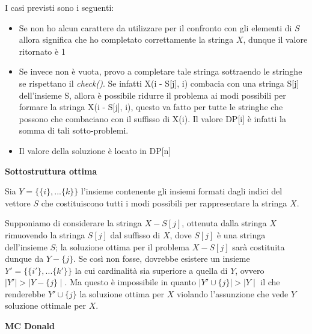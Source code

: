 \documentclass[../cheatSheetAlgoritmi.tex]{subfiles}
\begin{document}
I casi previsti sono i seguenti:
\begin{itemize}
	\item Se non ho alcun carattere da utilizzare per il confronto con gli elementi di $S$ allora significa che ho completato correttamente la stringa $X$, dunque il valore ritornato è 1
	\item Se invece non è vuota, provo a completare tale stringa sottraendo le stringhe se rispettano il \emph{check()}. Se infatti X(i - S[j], i) combacia con una stringa S[j] dell'insieme S, allora è possibile ridurre il problema ai modi possibili per formare la stringa X(i - S[j], i), questo va fatto per tutte le stringhe che possono che combaciano con il suffisso di X(i). Il valore DP[i] è infatti la somma di tali sotto-problemi. 
	\item Il valore della soluzione è locato in DP[n]
\end{itemize}
\textbf{Sottostruttura ottima} 

Sia $Y = \{\{i\}, ... \{k\}\}$ l'insieme contenente gli insiemi formati dagli indici del vettore $S$ che costituiscono tutti i modi possibili per rappresentare la stringa $X$. 

Supponiamo di considerare la stringa $X - {S[j]}$, ottenuta dalla stringa $X$ rimuovendo la stringa $S[j]$ dal suffisso di $X$, dove $S[j]$ è una stringa dell'insieme $S$; la soluzione ottima per il problema $X - {S[j]}$ sarà costituita dunque da $Y - \{j\}$. Se così non fosse, dovrebbe esistere un insieme $Y' = \{\{i'\}, ... \{k'\}\}$ la cui cardinalità sia superiore a quella di $Y$, ovvero $\mid Y' \mid > \mid Y - \{j\} \mid$. Ma questo è impossibile in quanto $\mid Y' \cup \{j\} \mid > \mid Y \mid$ il che renderebbe $Y' \cup \{j\}$ la soluzione ottima per $X$ violando l'assunzione che vede $Y$ soluzione ottimale per $X$.

\bigskip

\textbf{MC Donald}
\end{document}
